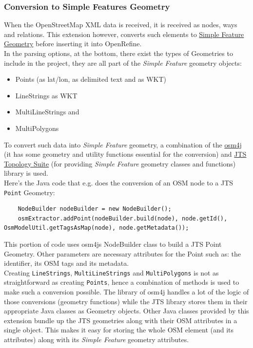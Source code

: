 \subsubsection{Conversion to Simple Features Geometry}\label{sec:conversion-to-simple-features-geometry}
When the OpenStreetMap XML data is received, it is received as nodes, ways and relations. This extension however, converts such
elements to \href{https://www.ogc.org/standards/sfa}{Simple Feature Geometry} before inserting it into OpenRefine.\\
\newline
In the parsing options, at the bottom, there exist the types of Geometries to include in the project, they are all part of the \textit{Simple Feature} geometry objects:
\begin{itemize}
    \item Points (as lat/lon, as delimited text and as WKT)
    \item LineStrings as WKT
    \item MultiLineStrings and
    \item MultiPolygons
\end{itemize}
To convert such data into \textit{Simple Feature} geometry, a combination of the \href{https://github.com/topobyte/osm4j}{osm4j}
(it has some geometry and utility functions essential for the conversion) and
\href{https://github.com/locationtech/jts}{JTS Topology Suite} (for providing \textit{Simple Feature} geometry classes and functions) library is used.\\
\newline
Here's the Java code that e.g. does the conversion of an OSM node to a JTS \texttt{Point} Geometry:
\begin{verbatim}
    NodeBuilder nodeBuilder = new NodeBuilder();
    osmExtractor.addPoint(nodeBuilder.build(node), node.getId(), OsmModelUtil.getTagsAsMap(node), node.getMetadata());
\end{verbatim}
This portion of code uses osm4j\textquotesingle s NodeBuilder class to build a JTS Point Geometry. Other parameters are necessary attributes for the Point such as:
the identifier, its OSM tags and its metadata.\\
\newline
Creating \texttt{LineStrings}, \texttt{MultiLineStrings} and \texttt{MultiPolygons} is not
as straightforward as creating \texttt{Points}, hence a combination of methods is used to make such a conversion possible.
The library of osm4j handles a lot of the logic of those conversions (geometry functions) while the JTS library stores
them in their appropriate Java classes as Geometry objects. Other Java classes provided by this extension bundle up the JTS geometries along
with their OSM attributes in a single object. This makes it easy for storing the whole OSM element (and its attributes)
along with its \textit{Simple Feature} geometry attributes.
